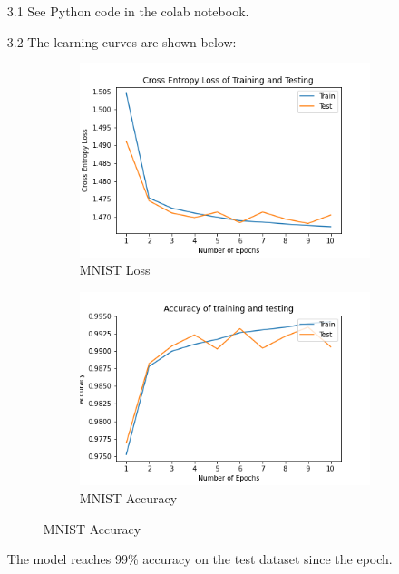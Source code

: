 \documentclass{article}
\begin{document}
    \begin{enumerate}
    	\item[3.1] See Python code in the colab notebook.
    	\item[3.2] The learning curves are shown below:
    	\begin{figure}[H]
        
     	\centering
     	\begin{subfigure}[b]{0.45\textwidth}
         	\centering
         	\includegraphics[width=\textwidth]
         	{Cross Entropy Loss of Training and Testing.png}
         	\caption{MNIST Loss}
         	\label{fig:MNIST Loss}
     	\end{subfigure}
     	\hfill
     	\begin{subfigure}[b]{0.45\textwidth}
         	\centering
         	\includegraphics[width=\textwidth]
         	{Accuracy of training and testing.png}
         	\caption{MNIST Accuracy}
         	\label{fig:MNIST Accuracy}
     	\end{subfigure}
     	\end{figure}
     	
     	The model reaches 99\% accuracy on the test dataset since the  epoch. 
    	
    \end{enumerate}
    
        
\end{document}
